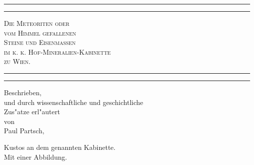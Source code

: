 \documentclass[a4paper, 11pt, oneside, polutonikogreek, german]{article}
\begin{document}
\begin{titlepage} %
	\centering %

	
	\rule{\textwidth}{1.6pt}\vspace*{-\baselineskip}\vspace*{2pt} %
	\rule{\textwidth}{0.4pt} %
	
	\vspace{1\baselineskip} %
	
	{\scshape\Huge Die Meteoriten oder\\[1.25pt] vom Himmel gefallenen \\[1.25pt] Steine und Eisenmassen\\[1.25pt] im k. k. Hof-Mineralien-Kabinette\\[4pt] zu Wien.}
	
	\vspace{1\baselineskip} %

	\rule{\textwidth}{0.4pt}\vspace*{-\baselineskip}\vspace{3.2pt} %
	\rule{\textwidth}{1.6pt} %
	
	\vspace{1\baselineskip} %
	
	
	{\Large Beschrieben,\\ und durch wissenschaftliche und geschichtliche \\ Zus"atze erl"autert \\ von \\ Paul Partsch,} %
	
	\vspace*{1\baselineskip} %
	
        {Kustos an dem genannten Kabinette. \\ Mit einer Abbildung.} %
    
        \vspace*{\fill}


\end{titlepage}
\end{document}
